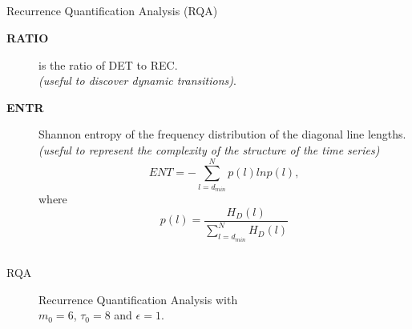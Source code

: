 \subsection{}
{

\begin{frame}{Recurrence Quantification Analysis (RQA)}

\begin{description}
\item [ \textbf{RATIO} ] is the ratio of DET to REC. \\
			\textit{(useful to discover dynamic transitions)}.
\item [ \textbf{ENTR} ] Shannon entropy of the frequency distribution of the 
			diagonal line lengths.
			\textit{(useful to represent the complexity of the 
				structure of the time series)}
\begin{equation*}
	ENT= - \sum^{N}_{l=d_{min}} p(l) ln p(l),
\end{equation*}
where 
\begin{equation*}
	p(l)=\frac{ H_D(l) }{ \sum^{N}_{ l=d_{min} } H_D(l) }
\end{equation*}

\end{description}


	
\end{frame}
}




\subsection{}
{

\begin{frame}{RQA}

    \begin{figure}
	\caption{Recurrence Quantification Analysis with \\
		$m_0=6$, $\tau_0=8$ and $\epsilon=1$.
		} 
   \end{figure}
		
\end{frame}
}







